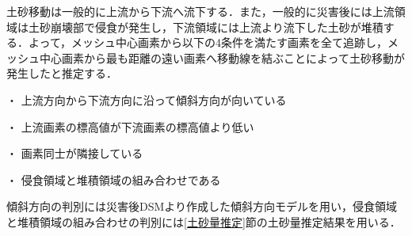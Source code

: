     土砂移動は一般的に上流から下流へ流下する．また，一般的に災害後には上流領域は土砂崩壊部で侵食が発生し，下流領域には上流より流下した土砂が堆積する．よって，メッシュ中心画素から以下の4条件を満たす画素を全て追跡し，メッシュ中心画素から最も距離の遠い画素へ移動線を結ぶことによって土砂移動が発生したと推定する．

    ・	上流方向から下流方向に沿って傾斜方向が向いている

    ・	上流画素の標高値が下流画素の標高値より低い
    
    ・	画素同士が隣接している
    
    ・	侵食領域と堆積領域の組み合わせである

    傾斜方向の判別には災害後DSMより作成した傾斜方向モデルを用い，侵食領域と堆積領域の組み合わせの判別には\ref{土砂量推定}節の土砂量推定結果を用いる．
  

